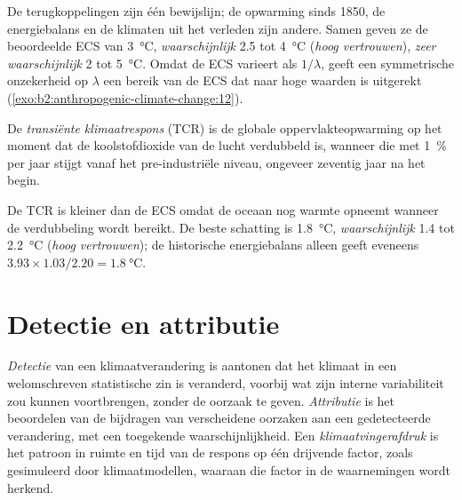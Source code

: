 De terugkoppelingen zijn één bewijslijn; de opwarming sinds 1850, de energiebalans en de klimaten
uit het verleden zijn andere. Samen geven ze de beoordeelde ECS van \qty{3}{\celsius}, \emph{waarschijnlijk}
2.5 tot \qty{4}{\celsius} (\emph{hoog vertrouwen}), \emph{zeer waarschijnlijk} 2 tot \qty{5}{\celsius}.
Omdat de ECS varieert als $1/\lambda$, geeft een symmetrische onzekerheid op $\lambda$ een bereik
van de ECS dat naar hoge waarden is uitgerekt (\cref{exo:b2:anthropogenic-climate-change:12}).

\begin{definition}\label{def:b2:anthropogenic-climate-change:tcr}
De \emph{transiënte klimaatrespons} (TCR) is de globale
oppervlakteopwarming op het moment dat de koolstofdioxide van de lucht verdubbeld is, wanneer die met \qty{1}{\percent}
per jaar stijgt vanaf het pre-industriële niveau, ongeveer zeventig jaar na het begin.
\end{definition}

De TCR is kleiner dan de ECS omdat de oceaan nog warmte opneemt wanneer de verdubbeling wordt
bereikt. De beste schatting is \qty{1.8}{\celsius}, \emph{waarschijnlijk} 1.4 tot \qty{2.2}{\celsius}
(\emph{hoog vertrouwen}); de historische energiebalans alleen geeft eveneens $3.93 \times 1.03/2.20 =
\qty{1.8}{\celsius}$.

\section{Detectie en attributie}\label{sec:b2:anthropogenic-climate-change:attribution}

\begin{definition}\label{def:b2:anthropogenic-climate-change:da}
\emph{Detectie} van een klimaatverandering is aantonen dat het
klimaat in een welomschreven statistische zin is veranderd, voorbij wat zijn interne variabiliteit zou kunnen
voortbrengen, zonder de oorzaak te geven. \emph{Attributie} is het beoordelen van de
bijdragen van verscheidene oorzaken aan een gedetecteerde verandering, met een toegekende waarschijnlijkheid. Een
\emph{klimaatvingerafdruk} is het patroon in ruimte en tijd van de respons op één
drijvende factor, zoals gesimuleerd door klimaatmodellen, waaraan die factor in de waarnemingen wordt herkend.
\end{definition}

